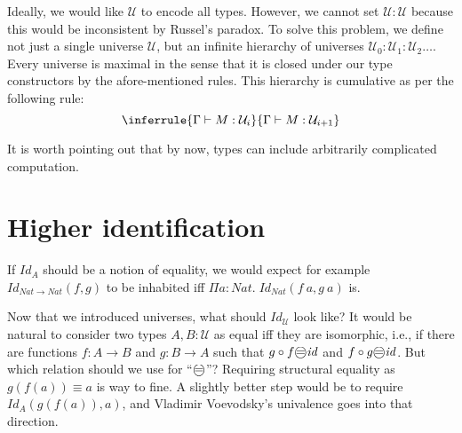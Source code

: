 \documentclass{article} \usepackage{chtt-notes} \usepackage{stmaryrd}
\newcommand{\entails}{\vdash}
\newcommand{\G}{\Gamma}
\newcommand{\Nat}{\mathit{Nat}}
\newcommand{\circled}[1]{\text{\textcircled{#1}}}
\begin{document}
Ideally, we would like $\mathcal{U}$ to encode all types.
However, we cannot set $\mathcal{U} : \mathcal{U}$ because this would be inconsistent by Russel's paradox.
To solve this problem, we define not just a single universe $\mathcal{U}$, but an infinite hierarchy of universes $\mathcal{U}_0: \mathcal{U}_1: \mathcal{U}_2 \dots$.
Every universe is maximal in the sense that it is closed under our type constructors by the afore-mentioned rules.
This hierarchy is cumulative as per the following rule:
\[ \inferrule{\G \entails M : \mathcal{U}_i}{\G \entails M : \mathcal{U}_{i + 1}}\]

It is worth pointing out that by now, types can include arbitrarily complicated computation.

\section{Higher identification}
If $\mathit{Id}_A$ should be a notion of equality, we would expect for example $\mathit{Id}_{\Nat \to \Nat}(f, g)$ to be inhabited iff $\Pi a: \Nat.\; \mathit{Id}_{\Nat}(f~a, g~a)$ is.

Now that we introduced universes, what should $\mathit{Id}_{\mathcal{U}}$ look like?
It would be natural to consider two types $A, B : \mathcal{U}$ as equal iff they are isomorphic, i.e., if there are functions $f : A \to B$ and $g : B \to A$ such that $g \circ f \circled{=} \mathit{id}$ and $f \circ g \circled{=} \mathit{id}$.
But which relation should we use for ``$\circled{=}$''?
Requiring structural equality as $g(f(a)) \equiv a$ is way to fine.
A slightly better step would be to require $\mathit{Id}_A(g(f(a)), a)$, and Vladimir Voevodsky's univalence goes into that direction. \medskip
\end{document}
